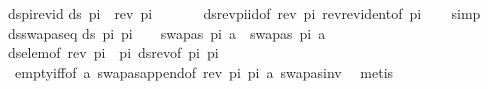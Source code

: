 \begin{isabellebody}
\endisatagproof
{\isafoldproof}%
%
\isadelimproof
\isanewline
%
\endisadelimproof
\isanewline
{}\isamarkupfalse%
\ ds{\isacharunderscore}{\kern0pt}pi{\isacharunderscore}{\kern0pt}rev{\isacharunderscore}{\kern0pt}id{\isacharcolon}{\kern0pt}\isanewline
{\isachardoublequoteopen}ds\ {\isacharparenleft}{\kern0pt}pi\ {\isacharat}{\kern0pt}\ rev\ pi{\isacharparenright}{\kern0pt}\ {\isacharbrackleft}{\kern0pt}{\isacharbrackright}{\kern0pt}\ {\isacharequal}{\kern0pt}\ {\isacharbraceleft}{\kern0pt}{\isacharbraceright}{\kern0pt}{\isachardoublequoteclose}\isanewline
%
\isadelimproof
\ \ %
\endisadelimproof
%
\isatagproof
{}\isamarkupfalse%
\ ds{\isacharunderscore}{\kern0pt}rev{\isacharunderscore}{\kern0pt}pi{\isacharunderscore}{\kern0pt}id{\isacharbrackleft}{\kern0pt}of\ {\isacartoucheopen}rev\ pi{\isacartoucheclose}{\isacharbrackright}{\kern0pt}\ rev{\isacharunderscore}{\kern0pt}rev{\isacharunderscore}{\kern0pt}ident{\isacharbrackleft}{\kern0pt}of\ pi{\isacharbrackright}{\kern0pt}\isanewline
\ \ \isamarkupfalse%
\ simp%
\endisatagproof
{\isafoldproof}%
%
\isadelimproof
\isanewline
%
\endisadelimproof
\isanewline
{}\isamarkupfalse%
\ ds{\isacharunderscore}{\kern0pt}swapas{\isacharunderscore}{\kern0pt}eq{\isacharcolon}{\kern0pt}\isanewline
{\isachardoublequoteopen}ds\ pi{}\ pi{}\ {\isacharequal}{\kern0pt}\ {\isacharbraceleft}{\kern0pt}{\isacharbraceright}{\kern0pt}\ {\isasymLongrightarrow}\ swapas\ pi{}\ a\ {\isacharequal}{\kern0pt}\ swapas\ pi{}\ a{\isachardoublequoteclose}\isanewline
%
\isadelimproof
\ \ %
\endisadelimproof
%
\isatagproof
{}\isamarkupfalse%
\ ds{\isacharunderscore}{\kern0pt}elem{\isacharbrackleft}{\kern0pt}of\ {\isacartoucheopen}rev\ pi{}\ {\isacharat}{\kern0pt}\ pi{}{\isacartoucheclose}{\isacharbrackright}{\kern0pt}\ ds{\isacharunderscore}{\kern0pt}rev{\isacharbrackleft}{\kern0pt}of\ pi{}\ pi{}{\isacharbrackright}{\kern0pt}\ \isanewline
\ \ empty{\isacharunderscore}{\kern0pt}iff{\isacharbrackleft}{\kern0pt}of\ a{\isacharbrackright}{\kern0pt}\ swapas{\isacharunderscore}{\kern0pt}append{\isacharbrackleft}{\kern0pt}of\ {\isacartoucheopen}rev\ pi{}{\isacartoucheclose}\ pi{}\ a{\isacharbrackright}{\kern0pt}\ swapas{\isacharunderscore}{\kern0pt}inv\ \isamarkupfalse%
\ metis%
\endisatagproof
{\isafoldproof}%
%
\isadelimproof
\isanewline
%
\endisadelimproof
\isanewline
\isanewline
\isanewline
\isanewline
\ \isanewline
{}\isamarkupfalse%

\end{isabellebody}
